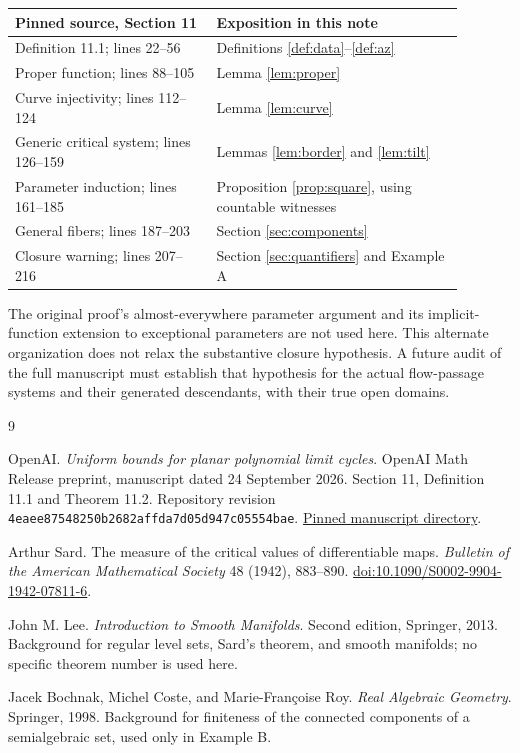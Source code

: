 \documentclass[11pt]{article}
\theoremstyle{definition}
\theoremstyle{remark}
\newcommand{\sourcecommit}{\texttt{4eaee87548250b2682affda7d05d947c05554bae}}
\begin{document}
\begin{center}
\begin{tabular}{@{}p{0.40\linewidth}p{0.49\linewidth}@{}}
\toprule
Pinned source, Section 11 & Exposition in this note\\
\midrule
Definition 11.1; lines 22--56
& Definitions \ref{def:data}--\ref{def:az}\\[3pt]
Proper function; lines 88--105
& Lemma \ref{lem:proper}\\[3pt]
Curve injectivity; lines 112--124
& Lemma \ref{lem:curve}\\[3pt]
Generic critical system; lines 126--159
& Lemmas \ref{lem:border} and \ref{lem:tilt}\\[3pt]
Parameter induction; lines 161--185
& Proposition \ref{prop:square}, using countable witnesses\\[3pt]
General fibers; lines 187--203
& Section \ref{sec:components}\\[3pt]
Closure warning; lines 207--216
& Section \ref{sec:quantifiers} and Example A\\
\bottomrule
\end{tabular}
\end{center}

The original proof's almost-everywhere parameter argument and its
implicit-function extension to exceptional parameters are not used
here. This alternate organization does not relax the substantive
closure hypothesis. A future audit of the full manuscript must
establish that hypothesis for the actual flow-passage systems and
their generated descendants, with their true open domains.

\begin{thebibliography}{9}

OpenAI.
\emph{Uniform bounds for planar polynomial limit cycles}.
OpenAI Math Release preprint, manuscript dated 24 September 2026.
Section 11, Definition 11.1 and Theorem 11.2.
Repository revision \sourcecommit.
\href{https://github.com/openai/math/tree/4eaee87548250b2682affda7d05d947c05554bae/preprints/uniform-bounds-for-planar-polynomial-limit-cycles-September-24-2026}{Pinned manuscript directory}.

Arthur Sard.
The measure of the critical values of differentiable maps.
\emph{Bulletin of the American Mathematical Society}
48 (1942), 883--890.
\href{https://doi.org/10.1090/S0002-9904-1942-07811-6}{doi:10.1090/S0002-9904-1942-07811-6}.

John M. Lee.
\emph{Introduction to Smooth Manifolds}.
Second edition, Springer, 2013.
Background for regular level sets, Sard's theorem, and smooth
manifolds; no specific theorem number is used here.

Jacek Bochnak, Michel Coste, and Marie-Fran\c{c}oise Roy.
\emph{Real Algebraic Geometry}.
Springer, 1998.
Background for finiteness of the connected components of a
semialgebraic set, used only in Example B.

\end{thebibliography}
\end{document}
